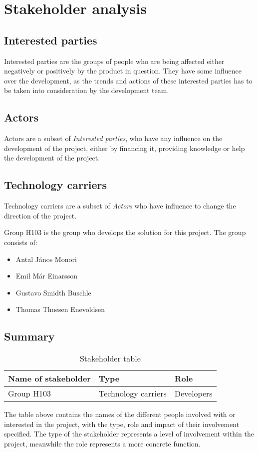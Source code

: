 \section{Stakeholder analysis}
	
\subsection{Interested parties}
Interested parties are the groups of people who are being affected either negatively or positively by the product in question. They have some influence over the development, as the trends and actions of these interested parties has to be taken into consideration by the development team.

\subsection{Actors}
Actors are a subset of \textit{Interested parties}, who have any influence on the development of the project, either by financing it, providing knowledge or help the development of the project.
	
\subsection{Technology carriers}
Technology carriers are a subset of \textit{Actors} who have influence to change the direction of the project.
	
Group H103 is the group who develops the solution for this project. The group consists of:
\begin{itemize}
	\item Antal János Monori
	\item Emil Már Einarsson
	\item Gustavo Smidth Buschle
	\item Thomas Thuesen Enevoldsen
\end{itemize}

\subsection{Summary}
\begin{table}[H]
	\begin{tabular}{ | p{5cm} | l | p{5cm} |}
	   	\hline
	   	\bfseries Name of stakeholder & \bfseries Type & \bfseries Role \\ \hline
	   	Group H103 & Technology carriers & Developers \\ \hline
	\end{tabular}
	\caption{Stakeholder table}
	\label{table:stakeholdertable}
\end{table}

The table above contains the names of the different people involved with or interested in the project, with the type, role and impact of their involvement specified. The type of the stakeholder represents a level of involvement within the project, meanwhile the role represents a more concrete function.
